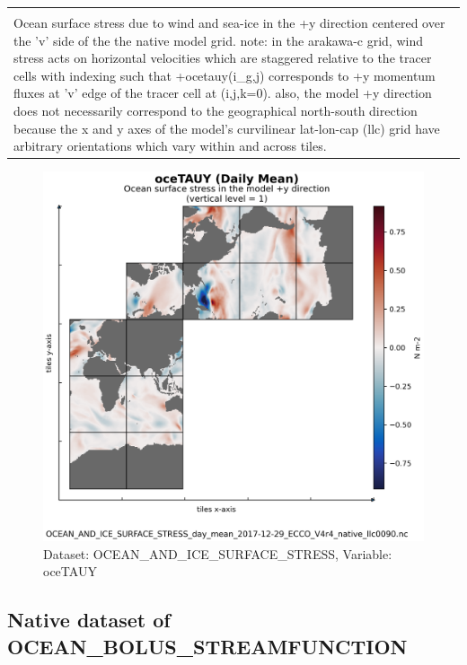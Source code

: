 \begin{longtable}{|m{}|m{}|m{}|m{}|}
{{{{{}}}}} \\ \hline
\rowcolor{lightgray} \multicolumn{4}{|c|}{\textbf{Comments}} \\ \hline
\multicolumn{4}{|p{1\textwidth}|}{\footnotesize{{Ocean surface stress due to wind and sea-ice in the +y direction centered over the 'v' side of the the native model grid. note: in the arakawa-c grid, wind stress acts on horizontal velocities which are staggered relative to the tracer cells with indexing such that +ocetauy(i\_g,j) corresponds to +y momentum fluxes at 'v' edge of the tracer cell at (i,j,k=0). also, the model +y direction does not necessarily correspond to the geographical north-south direction because the x and y axes of the model's curvilinear lat-lon-cap (llc) grid have arbitrary orientations which vary within and across tiles.}}} \\ \hline
\end{longtable}

\begin{figure}[H]
\centering
\includegraphics[scale=0.55]{../images/plots/native_plots/Ocean_and_Sea-Ice_Surface_Stress/oceTAUY.png}
\caption{Dataset: OCEAN\_AND\_ICE\_SURFACE\_STRESS, Variable: oceTAUY}
\label{tab:table-OCEAN_AND_ICE_SURFACE_STRESS_oceTAUY-Plot}
\end{figure}
\newpage
\subsection{Native dataset of OCEAN\_BOLUS\_STREAMFUNCTION}
\newp
